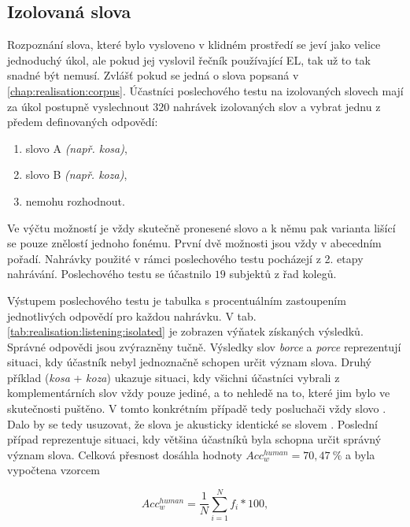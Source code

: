 \subsection{Izolovaná slova}
\label{chap:realisation:listening:isolated}

Rozpoznání slova, které bylo vysloveno v klidném prostředí se jeví jako velice jednoduchý úkol, ale pokud jej vyslovil řečník používající EL, tak už to tak snadné být nemusí. Zvlášť pokud se jedná o slova popsaná v \ref{chap:realisation:corpus}. Účastníci poslechového testu na izolovaných slovech mají za úkol postupně vyslechnout $320$ nahrávek izolovaných slov a vybrat jednu z předem definovaných odpovědí:

\begin{enumerate}[label=\alph*)]
  \item slovo A \textit{(např. kosa)},
  \item slovo B \textit{(např. koza)},
  \item nemohu rozhodnout.
\end{enumerate}

\noindent Ve výčtu možností je vždy skutečně pronesené slovo a k němu pak varianta lišící se pouze znělostí jednoho fonému. První dvě možnosti jsou vždy v abecedním pořadí. Nahrávky použité v rámci poslechového testu pocházejí z 2. etapy nahrávání. Poslechového testu se účastnilo $19$ subjektů z řad kolegů.

Výstupem poslechového testu je tabulka s procentuálním zastoupením jednotlivých odpovědí pro každou nahrávku. V tab. \ref{tab:realisation:listening:isolated} je zobrazen výňatek získaných výsledků. Správné odpovědi jsou zvýrazněny tučně. Výsledky slov \textit{borce} a \textit{porce} reprezentují situaci, kdy účastník nebyl jednoznačně schopen určit význam slova. Druhý příklad (\textit{kosa} + \textit{koza}) ukazuje situaci, kdy všichni účastníci vybrali z komplementárních slov vždy pouze jediné, a to nehledě na to, které jim bylo ve skutečnosti puštěno. V tomto konkrétním případě tedy posluchači vždy  slovo . Dalo by se tedy usuzovat, že slova  je akusticky identické se slovem . Poslední případ reprezentuje situaci, kdy většina účastníků byla schopna určit správný význam slova. Celková přesnost dosáhla hodnoty $Acc_w^{human} = 70,47\ \%$ a byla vypočtena vzorcem

\begin{equation}
  Acc_w^{human} = \frac{1}{N} \sum_{i=1}^{N} f_i * 100,
  \label{eq:realisation:accuracy:human}
\end{equation}

